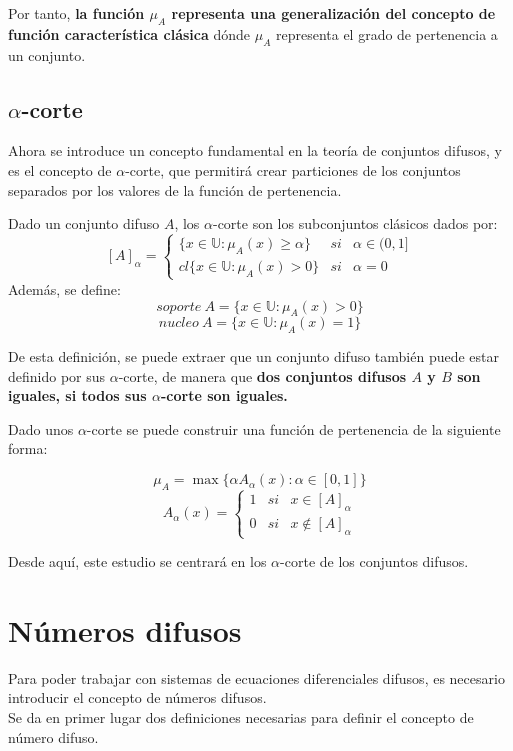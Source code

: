 Por tanto, \textbf{la función $\mu_A$ representa una generalización del concepto de función característica clásica} dónde $\mu_A$ representa el grado de pertenencia a un conjunto.

\subsection{$\alpha$-corte}
Ahora se introduce un concepto fundamental en la teoría de conjuntos difusos, y es el concepto de $\alpha$-corte, que permitirá crear particiones de los conjuntos separados por los valores de la función de pertenencia.
\begin{definicion}
	\label{def:alpha_corte}
	Dado un conjunto difuso $A$, los $\alpha$-corte son los subconjuntos clásicos dados por:
	\[
		[A]_\alpha = \left\{
			\begin{array}{ccc}
			\{x \in \mathbb{U} : \mu_A(x) \geq \alpha \} & si & \alpha \in (0, 1] \\
			cl\{x \in \mathbb{U} : \mu_A(x) > 0\} & si & \alpha=0
			\end{array}
		\right.
	\]
	Además, se define:
	\[
		soporte ~ A = \{x \in \mathbb{U} : \mu_A(x) > 0 \}
	\]
	\[
		nucleo ~ A = \{x \in \mathbb{U} : \mu_A(x) = 1 \}
	\]
\end{definicion}
De esta definición, se puede extraer que un conjunto difuso también puede estar definido por sus $\alpha$-corte, de manera que \textbf{dos conjuntos difusos $A$ y $B$ son iguales, si todos sus $\alpha$-corte son iguales.} 

Dado unos $\alpha$-corte se puede construir una función de pertenencia de la siguiente forma: \cite{apuntesfuzzy}

\[
	\mu_A = \max{\{\alpha A_\alpha(x) : \alpha \in [0, 1]}\}
\]
\[
	A_\alpha(x) = \left\{
		\begin{array}{ccc}
			1 & si & x \in [A]_\alpha \\
			0 & si & x \notin [A]_\alpha
		\end{array}
	\right.
\]

Desde aquí, este estudio se centrará en los $\alpha$-corte de los conjuntos difusos.

\section{Números difusos}
Para poder trabajar con sistemas de ecuaciones diferenciales difusos, es necesario introducir el concepto de números difusos. \\
Se da en primer lugar dos definiciones necesarias para definir el concepto de número difuso.

